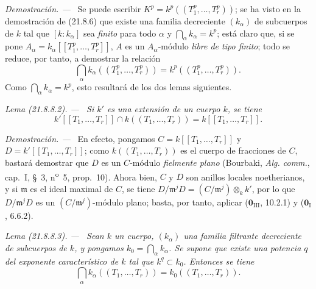 \documentclass[10pt,oneside]{book}
\makeatletter
\newcommand{\setmanualcurrentlabel}[1]{\def\@currentlabel{#1}}
\newenvironment{lemma}[1][]{%
  \setmanualcurrentlabel{#1}\par\medskip\noindent\itshape Lema (#1). ---\ }{\par}
\newenvironment{proof}{%
  \par\medskip\noindent\textit{Demostración. ---\ }}{\par}
\makeatother
\begin{document}
\begin{proof}
Se puede escribir $K^p=k^p((T_1^p,\ldots,T_r^p))$; se ha visto en la
demostración de (21.8.6) que existe una familia decreciente $(k_\alpha)$ de
subcuerpos de $k$ tal que $[k:k_\alpha]$ sea \emph{finito} para todo $\alpha$ y
$\bigcap_\alpha k_\alpha=k^p$; está claro que, si se pone
$A_\alpha=k_\alpha[[T_1^p,\ldots,T_r^p]]$, $A$ es un $A_\alpha$-módulo \emph{libre
de tipo finito}; todo se reduce, por tanto, a demostrar la relación
\begin{equation}
\tag{21.8.8.1}
\label{0.21.8.8.1-es}
  \bigcap_\alpha k_\alpha((T_1^p,\ldots,T_r^p))
  =k^p((T_1^p,\ldots,T_r^p)).
\end{equation}
Como $\bigcap_\alpha k_\alpha=k^p$, esto resultará de los dos lemas siguientes.
\end{proof}

\begin{lemma}[21.8.8.2]
\label{0.21.8.8.2-es}
Si $k'$ es una extensión de un cuerpo $k$, se tiene
\[
  k'[[T_1,\ldots,T_r]]\cap k((T_1,\ldots,T_r))=k[[T_1,\ldots,T_r]].
\]
\end{lemma}

\begin{proof}
En efecto, pongamos $C=k[[T_1,\ldots,T_r]]$ y
$D=k'[[T_1,\ldots,T_r]]$; como $k((T_1,\ldots,T_r))$ es el cuerpo de
fracciones de $C$, bastará demostrar que $D$ es un $C$-módulo
\emph{fielmente plano} (Bourbaki, \emph{Alg. comm.}, cap.~I, \S~3,
n\textsuperscript{o}~5, prop.~10). Ahora bien, $C$ y $D$ son anillos locales
noetherianos, y si $\mathfrak m$ es el ideal maximal de $C$, se tiene
$D/\mathfrak m^jD=(C/\mathfrak m^j)\otimes_k k'$, por lo que
$D/\mathfrak m^jD$ es un $(C/\mathfrak m^j)$-módulo plano; basta, por tanto,
aplicar ($\mathbf 0_{\mathrm{III}}$, 10.2.1) y
($\mathbf 0_{\mathrm I}$, 6.6.2).
\end{proof}

\begin{lemma}[21.8.8.3]
\label{0.21.8.8.3-es}
Sean $k$ un cuerpo, $(k_\alpha)$ una familia filtrante decreciente de
subcuerpos de $k$, y pongamos $k_0=\bigcap_\alpha k_\alpha$. Se supone que
existe una potencia $q$ del exponente característico de $k$ tal que
$k^q\subset k_0$. Entonces se tiene
\begin{equation}
\tag{21.8.8.4}
\label{0.21.8.8.4-es}
  \bigcap_\alpha k_\alpha((T_1,\ldots,T_r))=k_0((T_1,\ldots,T_r)).
\end{equation}
\end{lemma}
\end{document}
